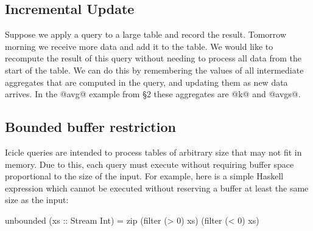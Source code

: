 \subsection{Incremental Update}

Suppose we apply a query to a large table and record the result. Tomorrow morning we receive more data and add it to the table. We would like to recompute the result of this query without needing to process all data from the start of the table. We can do this by remembering the values of all intermediate aggregates that are computed in the query, and updating them as new data arrives. In the @avg@ example from \S2 these aggregates are @k@ and @avgs@. 






\subsection{Bounded buffer restriction}
\label{s:IcicleSource:bounded}
Icicle queries are intended to process tables of arbitrary size that may not fit in memory. Due to this, each query must execute without requiring buffer space proportional to the size of the input. For example, here is a simple Haskell expression which cannot be executed without reserving a buffer at least the same size as the input:
\begin{code}
    unbounded (xs :: Stream Int)
     = zip (filter (> 0) xs) (filter (< 0) xs)
\end{code}

